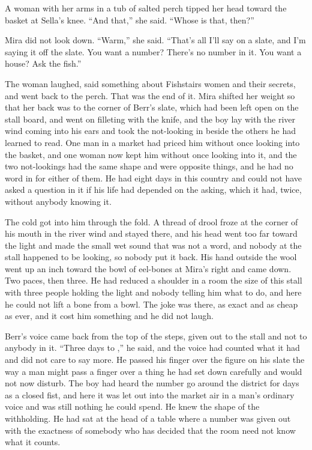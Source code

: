 A woman with her arms in a tub of salted perch tipped her head toward the basket at Sella's knee. “And that,” she said. “Whose is that, then?”

Mira did not look down. “Warm,” she said. “That's all I'll say on a slate, and I'm saying it off the slate. You want a number? There's no number in it. You want a house? Ask the fish.”

The woman laughed, said something about Fishstairs women and their secrets, and went back to the perch. That was the end of it. Mira shifted her weight so that her back was to the corner of Berr's slate, which had been left open on the stall board, and went on filleting with the knife, and the boy lay with the river wind coming into his ears and took the not-looking in beside the others he had learned to read. One man in a market had priced him without once looking into the basket, and one woman now kept him without once looking into it, and the two not-lookings had the same shape and were opposite things, and he had no word in  for either of them. He had eight days in this country and could not have asked a question in it if his life had depended on the asking, which it had, twice, without anybody knowing it.

The cold got into him through the fold. A thread of drool froze at the corner of his mouth in the river wind and stayed there, and his head went too far toward the light and made the small wet sound that was not a word, and nobody at the stall happened to be looking, so nobody put it back. His hand outside the wool went up an inch toward the bowl of eel-bones at Mira's right and came down. Two paces, then three. He had reduced a shoulder in a room the size of this stall with three people holding the light and nobody telling him what to do, and here he could not lift a bone from a bowl. The joke was there, as exact and as cheap as ever, and it cost him something and he did not laugh.

\scenebreak

Berr's voice came back from the top of the steps, given out to the stall and not to anybody in it. “Three days to ,” he said, and the voice had counted what it had and did not care to say more. He passed his finger over the figure on his slate the way a man might pass a finger over a thing he had set down carefully and would not now disturb. The boy had heard the number go around the district for days as a closed fist, and here it was let out into the market air in a man's ordinary voice and was still nothing he could spend. He knew the shape of the withholding. He had sat at the head of a table where a number was given out with the exactness of somebody who has decided that the room need not know what it counts.

